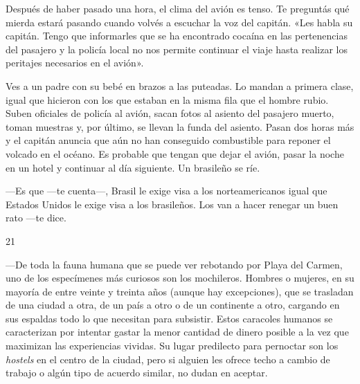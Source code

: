 \documentclass[12pt,twoside,openright,a5paper]{book}
\begin{document}
Después de haber pasado una hora, el clima del avión es tenso. 
Te preguntás qué mierda
estará pasando cuando volvés a escuchar la voz del capitán. 
«Les habla
su capitán. Tengo que informarles que se ha encontrado cocaína en las
pertenencias del pasajero y la policía local no nos permite continuar el
viaje hasta realizar los peritajes necesarios en el avión».

Ves a un padre
con su bebé en brazos a las puteadas. Lo mandan a primera clase, igual que
hicieron con los que estaban en la misma fila que el hombre rubio. Suben
oficiales de policía al avión, sacan fotos al asiento del pasajero muerto,
toman muestras y, por último, se llevan la funda del asiento. Pasan dos
horas más y el capitán anuncia que aún no han conseguido combustible para
reponer el volcado en el océano. Es probable que tengan que dejar el avión,
pasar la noche en un hotel y continuar al día siguiente. Un brasileño se
ríe. 

---Es que ---te cuenta---, Brasil le exige visa a los norteamericanos igual
que Estados Unidos le exige visa a los brasileños. Los van a hacer renegar
un buen rato ---te dice.

\vspace{0.5cm}

\hrulefill \hspace{0.1cm}\decofourleft\hspace{0.2cm} 21 \hspace{0.2cm}\decofourright \hspace{0.1cm}\hrulefill

\nopagebreak

\vspace{0.5cm}

\nopagebreak

---De toda la fauna humana que se puede ver rebotando por Playa del Carmen, uno
de los especímenes más curiosos son los mochileros. Hombres o mujeres,
en su mayoría de entre veinte y treinta años (aunque hay excepciones), que se
trasladan de una ciudad a otra, de un país a otro o de un continente a
otro, cargando en sus espaldas todo lo que necesitan para subsistir. Estos
caracoles humanos se caracterizan por intentar gastar la menor cantidad de
dinero posible a la vez que maximizan las experiencias vividas. Su lugar
predilecto para pernoctar son los \emph{hostels} en el centro de la ciudad, pero
si alguien les ofrece techo a cambio de trabajo o algún tipo de acuerdo
similar, no dudan en aceptar.
\end{document}
